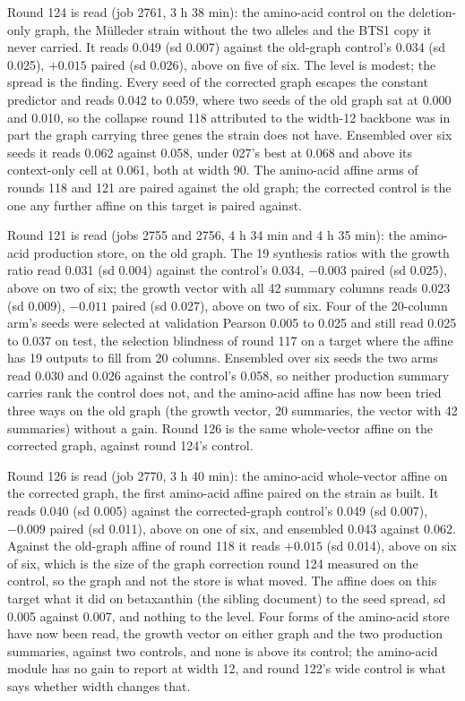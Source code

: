 Round 124 is read (job 2761, 3 h 38 min): the amino-acid control on the deletion-only
graph, the M\"ulleder strain without the two alleles and the BTS1 copy it never carried.
It reads 0.049 (sd 0.007) against the old-graph control's 0.034 (sd 0.025), $+0.015$
paired (sd 0.026), above on five of six. The level is modest; the spread is the finding.
Every seed of the corrected graph escapes the constant predictor and reads 0.042 to
0.059, where two seeds of the old graph sat at 0.000 and 0.010, so the collapse round
118 attributed to the width-12 backbone was in part the graph carrying three genes the
strain does not have. Ensembled over six seeds it reads 0.062 against 0.058, under 027's
best at 0.068 and above its context-only cell at 0.061, both at width 90. The
amino-acid affine arms of rounds 118 and 121 are paired against the old graph; the
corrected control is the one any further affine on this target is paired against.

Round 121 is read (jobs 2755 and 2756, 4 h 34 min and 4 h 35 min): the amino-acid
production store, on the old graph. The 19 synthesis ratios with the growth ratio read
0.031 (sd 0.004) against the control's 0.034, $-0.003$ paired (sd 0.025), above on two
of six; the growth vector with all 42 summary columns reads 0.023 (sd 0.009), $-0.011$
paired (sd 0.027), above on two of six. Four of the 20-column arm's seeds were selected
at validation Pearson 0.005 to 0.025 and still read 0.025 to 0.037 on test, the
selection blindness of round 117 on a target where the affine has 19 outputs to fill
from 20 columns. Ensembled over six seeds the two arms read 0.030 and 0.026 against the
control's 0.058, so neither production summary carries rank the control does not, and
the amino-acid affine has now been tried three ways on the old graph (the growth vector,
20 summaries, the vector with 42 summaries) without a gain. Round 126 is the same
whole-vector affine on the corrected graph, against round 124's control.

Round 126 is read (job 2770, 3 h 40 min): the amino-acid whole-vector affine on the
corrected graph, the first amino-acid affine paired on the strain as built. It reads
0.040 (sd 0.005) against the corrected-graph control's 0.049 (sd 0.007), $-0.009$ paired
(sd 0.011), above on one of six, and ensembled 0.043 against 0.062. Against the old-graph
affine of round 118 it reads $+0.015$ (sd 0.014), above on six of six, which is the size
of the graph correction round 124 measured on the control, so the graph and not the
store is what moved. The affine does on this target what it did on betaxanthin (the sibling
document) to the seed spread, sd 0.005 against 0.007, and nothing to the level. Four forms of the
amino-acid store have now been read, the growth vector on either graph and the two
production summaries, against two controls, and none is above its control; the
amino-acid module has no gain to report at width 12, and round 122's wide control is
what says whether width changes that.

